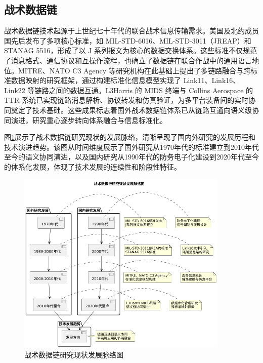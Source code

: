 \subsection{战术数据链}

战术数据链技术起源于上世纪七十年代的联合战术信息传输需求。美国及北约成员国先后发布了多项核心标准，如 MIL-STD-6016、MIL-STD-3011（JREAP）和 STANAG 5516\cite{丁丁2019,马建强2020}，形成了以 J 系列报文为核心的数据交换体系。这些标准不仅规范了消息格式、通信协议和互操作流程，也确立了数据链在联合作战中的通用语言地位。MITRE、NATO C3 Agency 等研究机构在此基础上提出了多链路融合与跨标准数据映射的研究框架\cite{程方昊2025,陈利玲2025}，通过构建标准化信息模型实现了 Link11、Link16、Link22 等链路之间的数据互通。L3Harris 的 MIDS 终端与 Collins Aerospace 的 TTR 系统已实现链路消息解析、协议转发和仿真验证，为多平台装备间的实时协同奠定了技术基础。这些成果标志着国外战术数据链体系已从链路互通向语义级协同演进，研究重心逐步转向体系融合与信息标准化。

图\ref{fig_tactical_datalink_research_status}展示了战术数据链研究现状的发展脉络，清晰呈现了国内外研究的发展历程和技术演进趋势。该图从时间维度展示了国外研究从1970年代的标准建立到2010年代至今的语义协同演进，以及国内研究从1990年代的防务电子化建设到2020年代至今的体系化发展，体现了技术发展的连续性和阶段性特征。

\begin{figure}[H]
    \centering
    \includegraphics[width=0.9\textwidth,height=0.6\textheight,keepaspectratio]{chapters/fig-0/tactical_datalink_research_status.png}
    \caption{战术数据链研究现状发展脉络图}
    \label{fig_tactical_datalink_research_status}
\end{figure}

